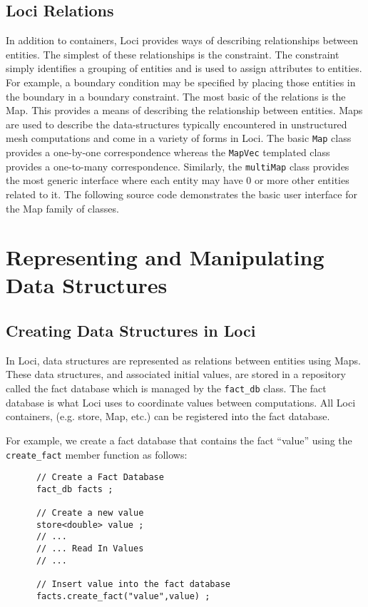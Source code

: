 \documentclass[10pt,epsf]{book}
\begin{document}


\section{Loci Relations}
In addition to containers, Loci provides ways of describing
relationships between entities.  The simplest of these relationships
is the constraint.  The constraint simply identifies a grouping of
entities and is used to assign attributes to entities.  For example,
a boundary condition may be specified by placing those entities in the
boundary in a boundary constraint.  The most basic of the relations is
the Map.  This provides a means of describing the relationship between
entities.  Maps are used to describe the data-structures typically
encountered in unstructured mesh computations and come in a variety of
forms in Loci.  The basic {\tt Map} class provides a one-by-one
correspondence whereas the {\tt MapVec} templated class provides a
one-to-many correspondence.  Similarly, the {\tt multiMap} class
provides the most generic interface where each entity may have 0 or
more other entities related to it.  The following source code
demonstrates the basic user interface for the Map family of classes.






\chapter{Representing and Manipulating Data Structures}
\section{Creating Data Structures in Loci}

In Loci, data structures are represented as relations between entities
using Maps.  These data structures, and associated initial values, are
stored in a repository called the fact database which is managed by
the {\tt fact\_db} class.  The fact database is what Loci uses to
coordinate values between computations.  All Loci containers, (e.g.
store, Map, etc.) can be registered into the fact database.

For example, we create a fact database that contains the fact ``value'' using the {\tt create\_fact} member function as follows:
\begin{verbatim}
      // Create a Fact Database
      fact_db facts ;

      // Create a new value
      store<double> value ;
      // ...
      // ... Read In Values
      // ...
   
      // Insert value into the fact database
      facts.create_fact("value",value) ;
\end{verbatim}
\end{document}
